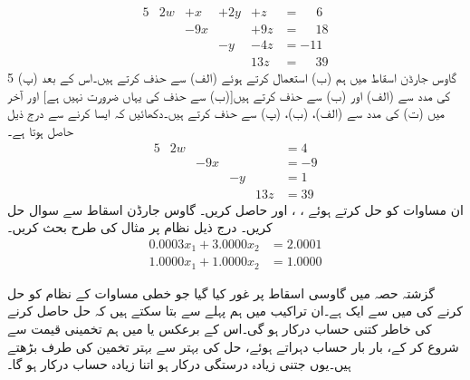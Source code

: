 \begin{alignat*}{5}
&2w&+x&+2y&+z&=\phantom{-0}6 \tag*{(الف)}\\
&{}&-9x&{}&+9z&=\phantom{-}18\tag*{(ب)}\\
&{}&{}&-y&-4z&=-11\tag*{(پ)}\\
&{}&{}&{}&13z&=\phantom{-}39\tag*{(ت)}
\end{alignat*}{5}
  گاوس جارڈن اسقاط میں ہم  (ب) استعمال کرتے ہوئے (الف) سے   حذف  کرتے ہیں۔اس کے بعد (پ) کی مدد سے (الف) اور (ب) سے  حذف کرتے ہیں[(ب) سے حذف کی یہاں ضرورت نہیں ہے] اور آخر میں (ت) کی مدد سے (الف)، (ب)، (پ) سے   حذف کرتے ہیں۔دکھائیں کہ ایسا کرنے سے درج ذیل حاصل ہوتا ہے۔
\begin{alignat*}{5}
&2w&{}&{}&{}&=4\\
&{}&-9x&{}&{}&=-9\\
&{}&{}&-y&{}&=1\\
&{}&{}&{}&13z&=39
\end{alignat*}
ان مساوات کو حل کرتے ہوئے  ، ،  اور  حاصل کریں۔
\quad
گاوس جارڈن اسقاط سے سوال  حل کریں۔
\quad
درج ذیل نظام پر مثال  کی طرح بحث کریں۔
\begin{align*}
0.0003x_1+3.0000x_2&=2.0001\\
1.0000x_1+1.0000x_2&=1.0000
\end{align*}

گزشتہ حصہ میں گاوسی اسقاط پر غور کیا گیا جو خطی مساوات کے نظام کو حل کرنے کی  میں سے ایک ہے۔ان تراکیب میں ہم پہلے سے بتا سکتے ہیں کہ حل حاصل کرنے کی خاطر کتنی حساب درکار ہو گی۔اس کے برعکس  یا  میں ہم تخمینی قیمت سے شروع کر کے، بار بار حساب دہراتے ہوئے، حل کی بہتر سے بہتر  تخمین کی طرف بڑھتے ہیں۔یوں جتنی زیادہ درستگی درکار ہو اتنا زیادہ حساب درکار ہو گا۔

